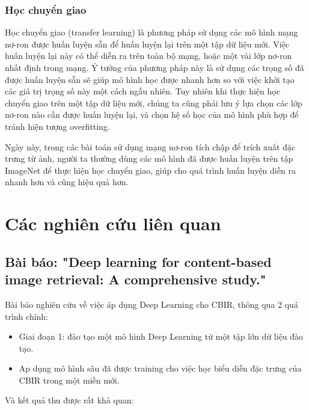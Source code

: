 \documentclass[a4paper,14pt]{extreport}
\begin{document}
\subsubsection*{ Học chuyển giao }
Học chuyển giao (transfer learning) là phương pháp sử dụng các mô hình mạng nơ-ron được huấn luyện 
sẵn để huấn luyện lại trên một tập dữ liệu mới. Việc huấn luyện lại này có thể diễn ra trên toàn bộ mạng, 
hoặc một vài lớp nơ-ron nhất định trong mạng. Ý tưởng của phương pháp này là sử dụng các trọng số đã được 
huấn luyện sẵn sẽ giúp mô hình học được nhanh hơn so với việc khởi tạo các giá trị trọng số này một cách
 ngẫu nhiên. Tuy nhiên khi thực hiện học chuyển giao trên một tập dữ liệu mới, chúng ta cũng phải lưu ý 
 lựa chọn các lớp nơ-ron nào cần được huấn luyện lại, và chọn hệ số học của mô hình phù hợp để tránh hiện 
 tượng overfitting.
\par 
Ngày này, trong các bài toán sử dụng mạng nơ-ron tích chập để trích xuất đặc trưng từ ảnh, người ta 
thường dùng các mô hình đã được huấn luyện trên tập ImageNet để thực hiện học chuyển giao, giúp cho quá 
trình huấn luyện diễn ra nhanh hơn và cũng hiệu quả hơn.

\section{Các nghiên cứu liên quan}
\subsection{Bài báo: "Deep learning for content-based image retrieval: A comprehensive study." \cite{paper-1}}

Bài báo nghiên cứu về việc áp dụng Deep Learning cho CBIR, thông qua 2 quá trình chính: 

\begin{itemize}
        \item Giai đoạn 1: đào tạo một mô hình Deep Learning từ một tập lớn dữ liệu đào tạo.
        \item Ap dụng mô hình sâu đã được training cho việc học biểu diễn đặc trưng của CBIR trong một miền mới.
\end{itemize}

Và kết quả thu được rất khả quan:
\end{document}
